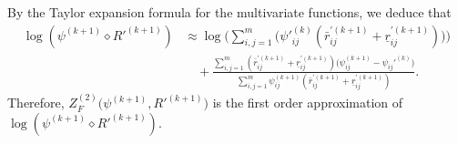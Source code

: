 \documentclass[11pt]{article}
\numberwithin{equation}{section}
\begin{document}
By the Taylor expansion formula  for the multivariate functions, we deduce that 
\begin{equation*}
\begin{split}
\log(\psi^{(k+1)}\diamond R'^{(k+1)})&\approx\log \bigg(\sum_{i,j=1}^{m}\Big( {\psi'}_{ij}^{(k)}(\bar r_{ij}^{'(k+1)}+\underline r_{ij}^{'(k+1)})\Big)\bigg)\\
&\quad+\frac{\sum_{i,j=1}^{m}(\bar r_{ij}^{'(k+1)}+\underline r_{ij}^{'(k+1)})
\Big(\psi_{ij}^{(k+1)}-\psi_{ij}'^{(k)}\Big)}{\sum_{i,j=1}^{m}\psi_{ij}^{(k+1)}(\bar r_{ij}^{'(k+1)}+\underline r_{ij}^{'(k+1)})}.
\end{split}
\end{equation*}
Therefore, $Z_F^{(2)}\Big(\psi^{(k+1)},R'^{(k+1)}\Big)$ is the first order approximation of $\log(\psi^{(k+1)}\diamond R'^{(k+1)})$.
\end{document}

